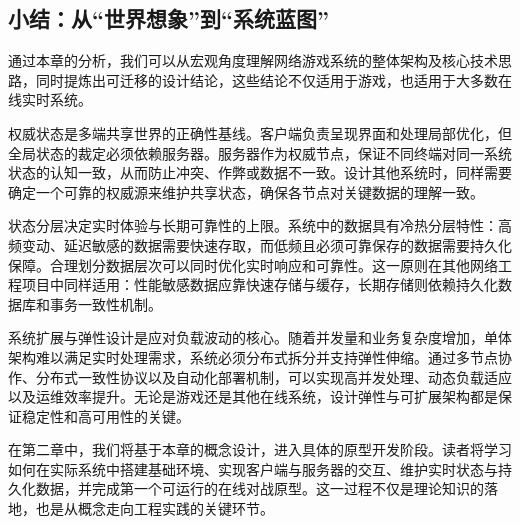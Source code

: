 \subsection{小结：从“世界想象”到“系统蓝图”}

通过本章的分析，我们可以从宏观角度理解网络游戏系统的整体架构及核心技术思路，同时提炼出可迁移的设计结论，这些结论不仅适用于游戏，也适用于大多数在线实时系统。

权威状态是多端共享世界的正确性基线。客户端负责呈现界面和处理局部优化，但全局状态的裁定必须依赖服务器。服务器作为权威节点，保证不同终端对同一系统状态的认知一致，从而防止冲突、作弊或数据不一致。设计其他系统时，同样需要确定一个可靠的权威源来维护共享状态，确保各节点对关键数据的理解一致。

状态分层决定实时体验与长期可靠性的上限。系统中的数据具有冷热分层特性：高频变动、延迟敏感的数据需要快速存取，而低频且必须可靠保存的数据需要持久化保障。合理划分数据层次可以同时优化实时响应和可靠性。这一原则在其他网络工程项目中同样适用：性能敏感数据应靠快速存储与缓存，长期存储则依赖持久化数据库和事务一致性机制。

系统扩展与弹性设计是应对负载波动的核心。随着并发量和业务复杂度增加，单体架构难以满足实时处理需求，系统必须分布式拆分并支持弹性伸缩。通过多节点协作、分布式一致性协议以及自动化部署机制，可以实现高并发处理、动态负载适应以及运维效率提升。无论是游戏还是其他在线系统，设计弹性与可扩展架构都是保证稳定性和高可用性的关键。

在第二章中，我们将基于本章的概念设计，进入具体的原型开发阶段。读者将学习如何在实际系统中搭建基础环境、实现客户端与服务器的交互、维护实时状态与持久化数据，并完成第一个可运行的在线对战原型。这一过程不仅是理论知识的落地，也是从概念走向工程实践的关键环节。


